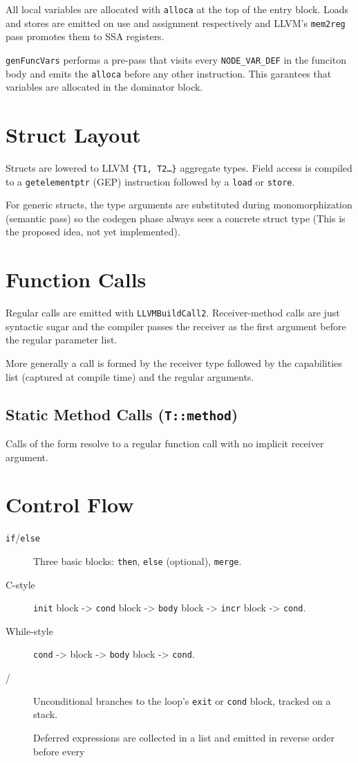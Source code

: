 All local variables are allocated with \texttt{alloca} at the top of the entry block.
Loads and stores are emitted on use and assignment respectively and LLVM's \texttt{mem2reg} pass promotes them to SSA registers.

\texttt{genFuncVars} performs a pre-pass that visits every \texttt{NODE\_VAR\_DEF} in the funciton body and emits the \texttt{alloca} before any other instruction. This garantees that variables are allocated in the dominator block.

\section{Struct Layout}
Structs are lowered to LLVM \texttt{\{T1, T2\ldots\}} aggregate types.
Field access is compiled to a \texttt{getelementptr} (GEP) instruction followed by a \texttt{load} or \texttt{store}.

For generic structs, the type arguments are substituted during monomorphization (semantic pass) so the codegen phase always sees a concrete struct type (This is the proposed idea, not yet implemented).

\section{Function Calls}

Regular calls are emitted with \texttt{LLVMBuildCall2}.
Receiver-method calls are just syntactic sugar and the compiler passes the receiver as the first argument before the regular parameter list.

More generally a call is formed by the receiver type followed by the capabilities list (captured at compile time) and the regular arguments.

\subsection{Static Method Calls (\texttt{T::method})}

Calls of the form  resolve to a regular function call with no implicit receiver argument.

\section{Control Flow}
\begin{description}
    \item[\texttt{if}/\texttt{else}] Three basic blocks: \texttt{then}, \texttt{else} (optional), \texttt{merge}.
    \item[C-style ] \texttt{init} block -> \texttt{cond} block -> \texttt{body} block -> \texttt{incr} block -> \texttt{cond}.
    \item[While-style ] \texttt{cond} -> block -> \texttt{body} block -> \texttt{cond}.
    \item[/] Unconditional branches to the loop's \texttt{exit} or \texttt{cond} block, tracked on a stack.
    \item[] Deferred expressions are collected in a list and emitted in reverse order before every 
\end{description}

